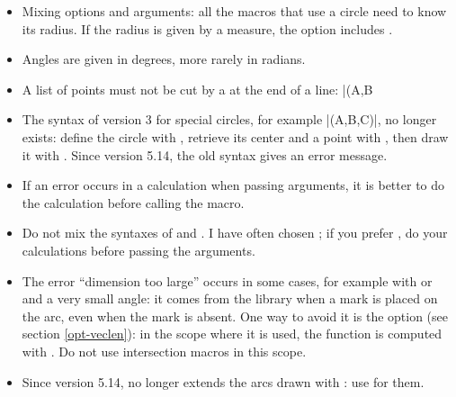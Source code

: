 \begin{itemize}
  \item Mixing options and arguments: all the macros that use a circle need to know its radius. If the radius is given by a measure, the option includes .

  \item Angles are given in degrees, more rarely in radians.

  \item A list of points must not be cut by a \code{\%} at the end of a line: |\tkzDrawSegments(A,B%

  \item The syntax of version 3 for special circles, for example |\tkzDrawCircle[euler](A,B,C)|, no longer exists: define the circle with , retrieve its center and a point with , then draw it with . Since version 5.14, the old syntax gives an error message.

  \item If an error occurs in a calculation when passing arguments, it is better to do the calculation before calling the macro.

  \item Do not mix the syntaxes of  and . I have often chosen ; if you prefer , do your calculations before passing the arguments.

  \item The error ``dimension too large'' occurs in some cases, for example with  or  and a very small angle: it comes from the library  when a mark is placed on the arc, even when the mark is absent. One way to avoid it is the option  (see section \ref{opt-veclen}): in the scope where it is used, the function  is computed with . Do not use intersection macros in this scope.

  \item Since version 5.14, \code{[delta=...]} no longer extends the arcs drawn with : use \code{[delta=...]} for them.
\end{itemize}
\endinput
